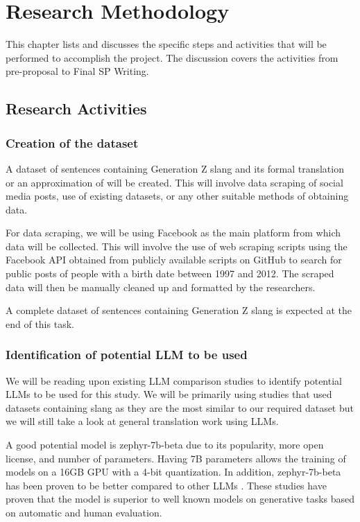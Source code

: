 \chapter{Research Methodology}
This chapter lists and discusses the specific steps and activities that will be performed to accomplish the project. 
The discussion covers the activities from pre-proposal to Final SP Writing.

\section{Research Activities}
\subsection{Creation of the dataset} 
A dataset of sentences containing Generation Z slang and its formal translation or an approximation of will be created. 
This will involve data scraping of social media posts, use of existing datasets, or any other suitable methods of obtaining data.

For data scraping, we will be using Facebook as the main platform from which data will be collected.
This will involve the use of web scraping scripts using the Facebook API obtained from publicly available scripts on GitHub to search for public posts of people with a birth date between 1997 and 2012. 
The scraped data will then be manually cleaned up and formatted by the researchers.

A complete dataset of sentences containing Generation Z slang is expected at the end of this task. 

\subsection{Identification of potential LLM to be used}
We will be reading upon existing LLM comparison studies to identify potential LLMs to be used for this study.
We will be primarily using studies that used datasets containing slang as they are the most similar to our required dataset but we will still take a look at general translation work using LLMs.

A good potential model is zephyr-7b-beta due to its popularity, more open license, and number of parameters.
Having 7B parameters allows the training of models on a 16GB GPU with a 4-bit quantization.
In addition, zephyr-7b-beta has been proven to be better compared to other LLMs \cite{Zhu_2023} \cite{zhao2024loraland310finetuned}.
These studies have proven that the model is superior to well known models on generative tasks based on automatic and human evaluation.

